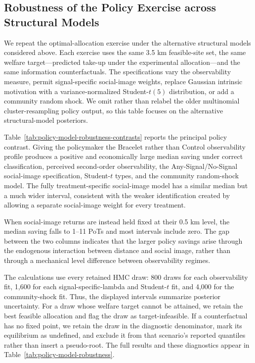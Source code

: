 \documentclass[12pt]{article}
\begin{document}
\providecommand{\StructuralRobustnessPath}{appendix/structural-robustness}

\subsection{Robustness of the Policy Exercise across Structural Models}
\label{app:policy-model-robustness}

We repeat the optimal-allocation exercise under the alternative structural
models considered above. Each exercise uses the same 3.5 km feasible-site set,
the same welfare target---predicted take-up under the experimental
allocation---and the same information counterfactuals. The specifications vary
the observability measure, permit signal-specific social-image weights, replace
Gaussian intrinsic motivation with a variance-normalized Student-$t(5)$
distribution, or add a community random shock. We omit rather than relabel the
older multinomial cluster-resampling policy output, so this table focuses on
the alternative structural-model posteriors.

Table~\ref{tab:policy-model-robustness-contrasts} reports the principal policy
contrast. Giving the policymaker the Bracelet rather than Control observability
profile produces a positive and economically large median saving under correct
classification, perceived second-order observability, the
Any-Signal/No-Signal social-image specification, Student-$t$ types, and the
community random-shock model. The fully treatment-specific social-image model
has a similar median but a much wider interval, consistent with the weaker
identification created by allowing a separate social-image weight for every
treatment.

\begin{table}[htbp]
  \centering
  \small
  \caption{Optimal-policy robustness across structural models}
  \label{tab:policy-model-robustness-contrasts}
  
\end{table}

When social-image returns are instead held fixed at their 0.5 km level, the
median saving falls to 1--11 PoTs and most intervals include zero. The gap
between the two columns indicates that the larger policy savings arise through
the endogenous interaction between distance and social image, rather than
through a mechanical level difference between observability regimes.

The calculations use every retained HMC draw: 800 draws for
each observability fit, 1,600 for each signal-specific-lambda and Student-$t$
fit, and 4,000 for the community-shock fit. Thus, the displayed intervals
summarize posterior uncertainty. For a draw whose welfare target cannot
be attained, we retain the best feasible allocation and flag the draw as
target-infeasible. If a counterfactual has no fixed point, we retain the draw in
the diagnostic denominator, mark its equilibrium as undefined, and exclude it
from that scenario's reported quantiles rather than insert a pseudo-root. The
full results and these diagnostics appear in
Table~\ref{tab:policy-model-robustness}.


\end{document}
